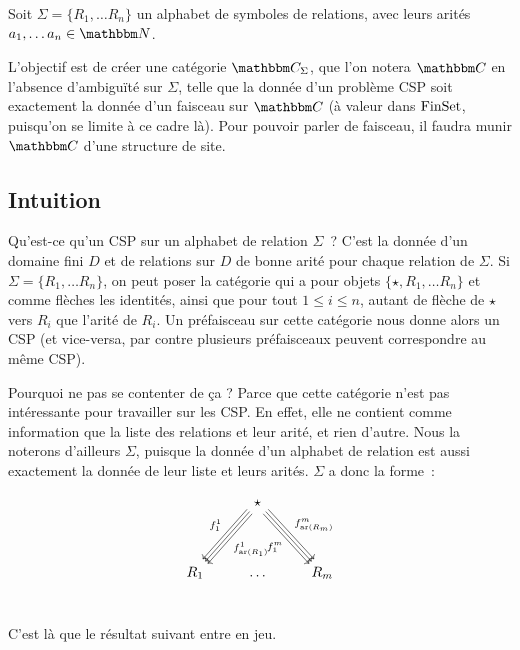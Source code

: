 
Soit $\Sigma = \{R_1, \dots R_n\}$ un alphabet de symboles de relations, avec
leurs arités $a_1, \dots a_n\in\N$.

L'objectif est de créer une catégorie $\C_\Sigma$, que l'on notera $\C$ en l'absence
d'ambiguïté sur $\Sigma$, telle que la donnée d'un problème CSP soit exactement la donnée
d'un faisceau sur $\C$ (à valeur dans $\text{FinSet}$, puisqu'on se limite à ce cadre là). Pour
pouvoir parler de faisceau, il faudra munir $\C$ d'une structure de site.

\subsection{Intuition}

Qu'est-ce qu'un CSP
sur un alphabet de relation $\Sigma$~? C'est la donnée d'un domaine fini $D$ et
de relations sur $D$ de bonne arité pour chaque relation de $\Sigma$. Si
$\Sigma = \{R_1, \dots R_n\}$, on peut poser la catégorie qui a pour objets
$\{\star, R_1, \dots R_n\}$ et comme flèches les identités, ainsi que pour
tout $1\leq i\leq n$, autant de flèche de $\star$ vers $R_i$ que l'arité de
$R_i$. Un préfaisceau sur cette catégorie nous donne alors un CSP (et
vice-versa, par contre plusieurs préfaisceaux peuvent correspondre au même
CSP).

Pourquoi ne pas se contenter de ça ? Parce que cette catégorie n'est pas
intéressante pour travailler sur les CSP. En effet, elle ne contient comme
information que la liste des relations et leur arité, et rien d'autre. Nous la
noterons d'ailleurs $\Sigma$, puisque la donnée d'un alphabet de relation est
aussi exactement la donnée de leur liste et leurs arités. $\Sigma$ a donc la forme~:

\[\begin{tikzcd}
    & \star \arrow[ddl, shift right, swap, "f_1^1"]
            \arrow[ddl]
            \arrow[ddl, shift left, "f_{\text{ar}(R_1)}^1"]
            \arrow[ddr, shift right, swap, "f_1^m"]
            \arrow[ddr]
            \arrow[ddr, shift left, "f_{\text{ar}(R_m)}^m"]
            \\
    & & \\
    R_1 & \dots & R_m \\
\end{tikzcd}\]

C'est là que le résultat suivant entre en jeu.

